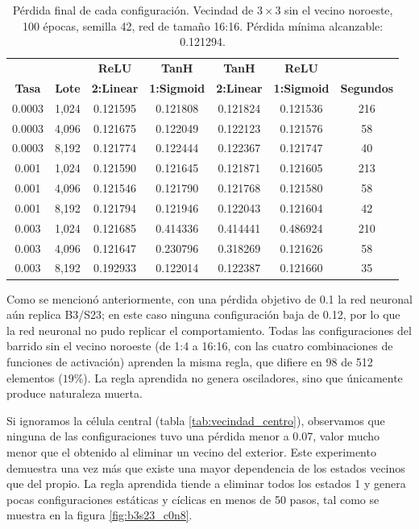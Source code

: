 \begin{table}[H]
	\centering
	\small
	\begin{tabular}{ccccccc}
		\toprule
		& & \textbf{ReLU} & \textbf{TanH} & \textbf{TanH} & \textbf{ReLU} &  \\
		\textbf{Tasa} & \textbf{Lote} & \textbf{2:Linear }&  \textbf{1:Sigmoid }& \textbf{2:Linear  }& \textbf{1:Sigmoid} & \textbf{Segundos}  \\
		\midrule
		0.0003 & 1,024 & 0.121595 & 0.121808 & 0.121824 & 0.121536 & 216 \\
		0.0003 & 4,096 & 0.121675 & 0.122049 & 0.122123 & 0.121576 & 58 \\
		0.0003 & 8,192 & 0.121774 & 0.122444 & 0.122367 & 0.121747 & 40 \\
		\midrule
		0.001 & 1,024 & 0.121590 & 0.121645 & 0.121871 & 0.121605 & 213 \\
		0.001 & 4,096 & 0.121546 & 0.121790 & 0.121768 & 0.121580 & 58 \\
		0.001 & 8,192 & 0.121794 & 0.121946 & 0.122043 & 0.121604 & 42 \\
		\midrule
		0.003 & 1,024 & 0.121685 & 0.414336 & 0.414441 & 0.486924 & 210 \\
		0.003 & 4,096 & 0.121647 & 0.230796 & 0.318269 & 0.121626 & 58 \\
		0.003 & 8,192 & 0.192933 & 0.122014 & 0.122387 & 0.121660 & 35 \\
		\bottomrule
	\end{tabular}
	\caption{Pérdida final de cada configuración. Vecindad de $3 \times 3$ sin el vecino noroeste, 100 épocas, semilla 42, red de tamaño 16:16. Pérdida mínima alcanzable: 0.121294.}
	\label{tab:vecindad_ajuste_16x16}
\end{table}

Como se mencionó anteriormente, con una pérdida objetivo de 0.1 la red neuronal aún replica B3/S23; en este caso ninguna configuración baja de 0.12, por lo que la red neuronal no pudo replicar el comportamiento. Todas las configuraciones del barrido sin el vecino noroeste (de 1:4 a 16:16, con las cuatro combinaciones de funciones de activación) aprenden la misma regla, que difiere en 98 de 512 elementos ($19\%$). La regla aprendida no genera osciladores, sino que únicamente produce naturaleza muerta. 

Si ignoramos la célula central (tabla \ref{tab:vecindad_centro}), observamos que ninguna de las configuraciones tuvo una pérdida menor a 0.07, valor mucho menor que el obtenido al eliminar un vecino del exterior. Este experimento demuestra una vez más que existe una mayor dependencia de los estados vecinos que del propio. La regla aprendida tiende a eliminar todos los estados 1 y genera pocas configuraciones estáticas y cíclicas en menos de 50 pasos, tal como se muestra en la figura \ref{fig:b3s23_c0n8}.

